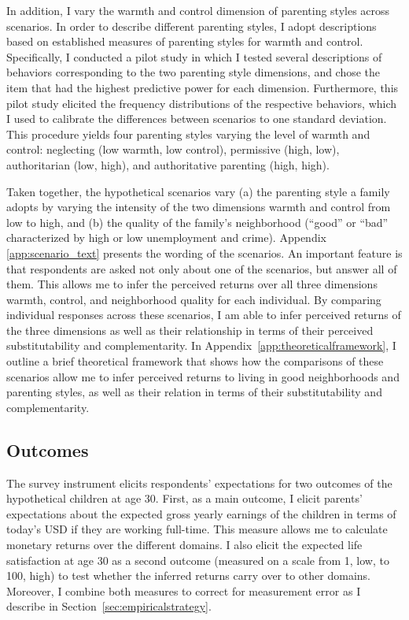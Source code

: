 \documentclass[12pt, a4paper, english]{article}
\begin{document}
In addition, I vary the warmth and control dimension of parenting styles across scenarios. In order to describe different parenting styles, I adopt descriptions based on established measures of parenting styles for warmth and control. Specifically, I conducted a pilot study in which I tested several descriptions of behaviors corresponding to the two parenting style dimensions, and chose the item that had the highest predictive power for each dimension. Furthermore, this pilot study elicited the frequency distributions of the respective behaviors, which I used to calibrate the differences between scenarios to one standard deviation. This procedure yields four parenting styles varying the level of warmth and control: neglecting (low warmth, low control), permissive (high, low), authoritarian (low, high), and authoritative parenting (high, high).

Taken together, the hypothetical scenarios vary (a) the parenting style a family adopts by varying the intensity of the two dimensions warmth and control from low to high, and (b) the quality of the family's neighborhood (``good'' or ``bad'' characterized by high or low unemployment and crime). Appendix \ref{app:scenario_text} presents the wording of the scenarios. An important feature is that respondents are asked not only about one of the scenarios, but answer all of them. This allows me to infer the perceived returns over all three dimensions warmth, control, and neighborhood quality for each individual. By comparing individual responses across these scenarios, I am able to infer perceived returns of the three dimensions as well as their relationship in terms of their perceived substitutability and complementarity. 
In Appendix~\ref{app:theoreticalframework}, I outline a brief theoretical framework that shows how the comparisons of these scenarios allow me to infer perceived returns to living in good neighborhoods and parenting styles, as well as their relation in terms of their substitutability and complementarity.

\subsection{Outcomes}
The survey instrument elicits respondents' expectations for two outcomes of the hypothetical children at age 30. First, as a main outcome, I elicit parents' expectations about the expected gross yearly earnings of the children in terms of today's USD if they are working full-time. This measure allows me to calculate monetary returns over the different domains. I also elicit the expected life satisfaction at age 30 as a second outcome (measured on a scale from 1, low, to 100, high) to test whether the inferred returns carry over to other domains. Moreover, I combine both measures to correct for measurement error as I describe in Section~\ref{sec:empiricalstrategy}.
\end{document}
